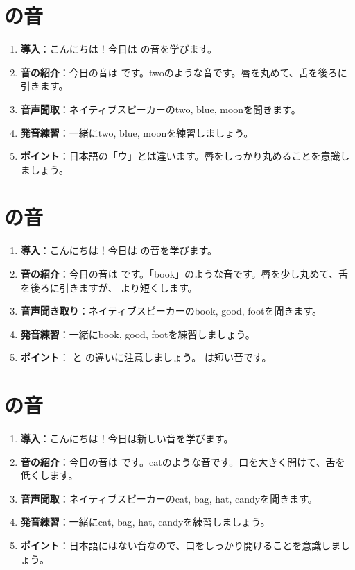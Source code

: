 \documentclass[book,jafontscale=0.9247]{jlreq}
\begin{document}
\section{ の音}
\begin{enumerate}
    \item \textbf{導入}：こんにちは！今日は  の音を学びます。
    \item \textbf{音の紹介}：今日の音は  です。twoのような音です。唇を丸めて、舌を後ろに引きます。
    \item \textbf{音声聞取}：ネイティブスピーカーのtwo, blue, moonを聞きます。
    \item \textbf{発音練習}：一緒にtwo, blue, moonを練習しましょう。
    \item \textbf{ポイント}：日本語の「ウ」とは違います。唇をしっかり丸めることを意識しましょう。
\end{enumerate}

\section{ の音}
\begin{enumerate}
    \item \textbf{導入}：こんにちは！今日は  の音を学びます。
    \item \textbf{音の紹介}：今日の音は  です。「book」のような音です。唇を少し丸めて、舌を後ろに引きますが、 より短くします。
    \item \textbf{音声聞き取り}：ネイティブスピーカーのbook, good, footを聞きます。
    \item \textbf{発音練習}：一緒にbook, good, footを練習しましょう。
    \item \textbf{ポイント}： と  の違いに注意しましょう。  は短い音です。
\end{enumerate}



\section{ の音}
\begin{enumerate}
    \item \textbf{導入}：こんにちは！今日は新しい音を学びます。
    \item \textbf{音の紹介}：今日の音は  です。catのような音です。口を大きく開けて、舌を低くします。
    \item \textbf{音声聞取}：ネイティブスピーカーのcat, bag, hat, candyを聞きます。
    \item \textbf{発音練習}：一緒にcat, bag, hat, candyを練習しましょう。
    \item \textbf{ポイント}：日本語にはない音なので、口をしっかり開けることを意識しましょう。
 \end{enumerate}
\end{document}
